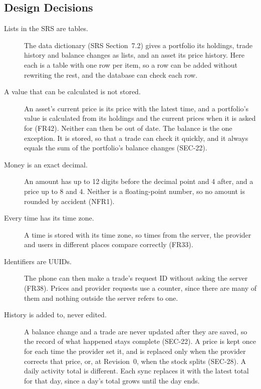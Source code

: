 \documentclass[12pt, titlepage]{article}
\begin{document}
\subsection{Design Decisions}

\begin{description}
\item[Lists in the SRS are tables.] The data dictionary (SRS Section~7.2) gives
  a portfolio its holdings, trade history and balance changes as lists, and an
  asset its price history. Here each is a table with one row per item, so a row
  can be added without rewriting the rest, and the database can check each row.

\item[A value that can be calculated is not stored.] An asset's current price
  is its price with the latest time, and a portfolio's value is calculated from
  its holdings and the current prices when it is asked for (FR42). Neither can
  then be out of date. The balance is the one exception. It is stored, so that
  a trade can check it quickly, and it always equals the sum of the portfolio's
  balance changes (SEC-22).

\item[Money is an exact decimal.] An amount has up to 12 digits before the
  decimal point and 4 after, and a price up to 8 and 4. Neither is a
  floating-point number, so no amount is rounded by accident (NFR1).

\item[Every time has its time zone.] A time is stored with its time zone, so
  times from the server, the provider and users in different places compare
  correctly (FR33).

\item[Identifiers are UUIDs.] The phone can then make a trade's request ID
  without asking the server (FR38). Prices and provider requests use a counter,
  since there are many of them and nothing outside the server refers to one.

\item[History is added to, never edited.] A balance change and a trade are
  never updated after they are saved, so the record of what happened stays
  complete (SEC-22). A price is kept once for each time the provider set it,
  and is replaced only when the provider corrects that price, or, at
  Revision~0, when the stock splits (SEC-28). A daily activity
  total is different. Each sync replaces
  it with the latest total for that day, since a day's total grows until the
  day ends.


\end{description}
\end{document}
